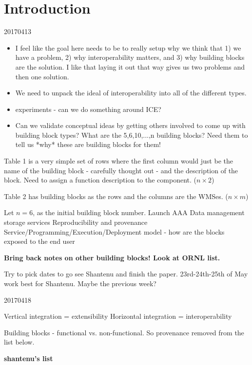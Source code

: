 \section{Introduction}

20170413
\begin{itemize}
\item I feel like the goal here needs to be to really setup why we think that 1) we have a problem, 2) why interoperability matters, and 3) why building blocks are the solution. I like that laying it out that way gives us two problems and then one solution.
\item We need to unpack the ideal of interoperability into all of the different types.
\item experiments - can we do something around ICE?
\item Can we validate conceptual ideas by getting others involved to come up with building block types? What are the 5,6,10,...,n building blocks? Need them to tell us *why* these are building blocks for them!
\end{itemize}

Table 1 is a very simple set of rows where the first column would just be the name of the building block - carefully thought out - and the description of the block. Need to assign a function description to the component. ($n \times 2$)

Table 2 has building blocks as the rows and the columns are the WMSes. ($n \times m$)

Let $n = 6$, as the initial building block number.
Launch
AAA
Data management storage services
Reproducibility and provenance
Service/Programming/Execution/Deployment model - how are the blocks exposed to the end user

\textbf{Bring back notes on other building blocks! Look at ORNL list.}

Try to pick dates to go see Shantenu and finish the paper. 23rd-24th-25th of May work best for Shantenu. Maybe the previous week?

20170418

Vertical integration = extensibility
Horizontal integration = interoperability

Building blocks - functional vs. non-functional. So provenance removed from the list below.

\bf{shantenu's list}


